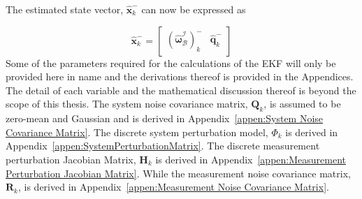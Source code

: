The estimated state vector, $\hat{\mathbf{x}}_k^-$ can now be expressed as 

\begin{equation}
	\hat{\mathbf{x}}_k^- = \begin{bmatrix} (\boldsymbol{\hat{\omega}}_{\mathcal{B}}^{\mathcal{I}})_k^- & \hat{\mathbf{q}}_k^-\end{bmatrix}
\end{equation}
Some of the parameters required for the calculations of the EKF will only be provided here in name and the derivations thereof is provided in the Appendices. The detail of each variable and the mathematical discussion thereof is beyond the scope of this thesis. The system noise covariance matrix, $\mathbf{Q}_k$, is assumed to be zero-mean and Gaussian and is derived in Appendix~\ref{appen:System Noise Covariance Matrix}. The discrete system perturbation model, $\Phi_k$ is derived in Appendix~\ref{appen:SystemPerturbationMatrix}. The discrete measurement perturbation Jacobian Matrix, $\mathbf{H}_k$ is derived in Appendix~\ref{appen:Measurement Perturbation Jacobian Matrix}. While the measurement noise covariance matrix, $\mathbf{R}_k$, is derived in Appendix~\ref{appen:Measurement Noise Covariance Matrix}.

